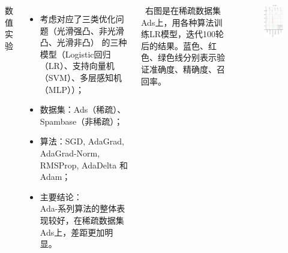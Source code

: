 \documentclass[9pt,aspectratio=169]{beamer}
\begin{document}
\begin{frame}
	\begin{columns}
		\LARGE 数值实验
\vspace{0.3cm}
		\normalsize
		\begin{itemize}
			\item {
				考虑对应了三类优化问题（光滑强凸、非光滑凸、光滑非凸）
				的三种模型（Logistic回归（LR）、支持向量机（SVM）、多层感知机（MLP））；
			}
			\item {数据集：Ads（稀疏）、Spambase（非稀疏）；}
			\item {算法：SGD, AdaGrad, AdaGrad-Norm, RMSProp, AdaDelta 和 Adam；}
			\item {主要结论：\\ 
			Ada-系列算法的整体表现较好，在稀疏数据集Ads上，差距更加明显。}
			\vspace{0.3cm}
		\end{itemize}\
		右图是在稀疏数据集Ads上，用各种算法训练LR模型，迭代100轮后的结果。蓝色、红色、绿色线分别表示验证准确度、精确度、召回率。
	\begin{figure}
			\centering
			\includegraphics[width=5.1cm]{image/1new.eps}
	\end{figure}
\end{columns}
\end{frame}
\end{document}
